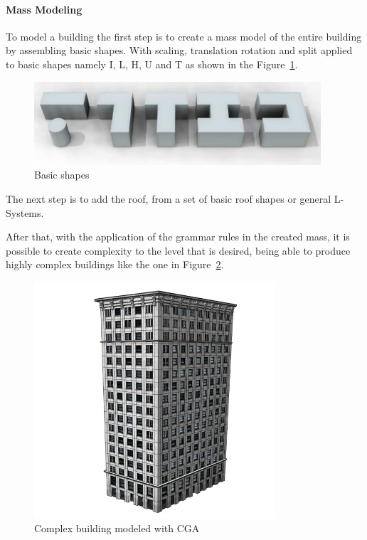 \paragraph{Mass Modeling} %
\label{par:mass_modeling}
To model a building the first step is to create a mass model of the entire building by assembling basic shapes. With scaling, translation rotation and split applied to basic shapes namely I, L, H, U and T as shown in the Figure~\ref{fig:basic_shapes}.

\begin{figure}[htbp]
  \centering
  \includegraphics[width=0.95\textwidth]{img/Procedural-Modeling-of-Cities/MassModeling2.png}
  \caption{Basic shapes}
  \label{fig:basic_shapes}
\end{figure}


The next step is to add the roof, from a set of basic roof shapes or general L-Systems.

After that, with the application of the grammar rules in the created mass, it is possible to create complexity to the level that is desired, being able to produce highly complex buildings like the one in Figure~\ref{fig:CEnewbuilding}.


\begin{figure}[htbp]
  \centering
  \includegraphics[width=0.8\textwidth]{img/Procedural-Modeling-of-Cities/building2.png}
  \caption{Complex building modeled with CGA}
  \label{fig:CEnewbuilding}
\end{figure}

